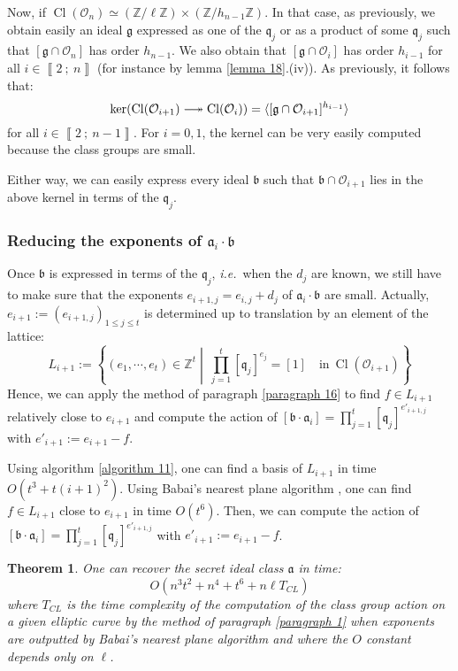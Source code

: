 \documentclass[a4paper,10pt]{report}
\theoremstyle{definition}
\theoremstyle{plain}
\newtheorem{theorem}[definition]{Theorem}
\theoremstyle{definition}
\newcommand{\ie}{\emph{i.e.}\ }
\newcommand{\Z}{\mathbb{Z}}
\newcommand{\mO}{\mathcal{O}}
\renewcommand{\i}[2]{\left\llbracket #1~;~#2\right\rrbracket}
\renewcommand{\(}{\left(}
\renewcommand{\)}{\right)}
\newcommand{\mf}[1]{\mathfrak{#1}}
\DeclareMathOperator{\Cl}{Cl}
\begin{document}
Now, if $\Cl(\mO_n)\simeq(\Z/\ell\Z)\times(\Z/h_{n-1}\Z)$.  In that case, as previously, we obtain easily an ideal $\mf{g}$ expressed as one of the $\mf{q}_j$ or as a product of some $\mf{q}_j$ such that $[\mf{g}\cap\mO_n]$ has order $h_{n-1}$. We also obtain that $[\mf{g}\cap\mO_i]$ has order $h_{i-1}$ for all $i\in\i{2}{n}$ (for instance by lemma \ref{lemma 18}.(iv)).  As previously, it follows that:
\[\ker(\Cl(\mO_{i+1})\relbar\joinrel\twoheadrightarrow\Cl(\mO_{i}))=\langle [\mf{g}\cap\mO_{i+1}]^{h_{i-1}}\rangle\]
for all $i\in\i{2}{n-1}$. For $i=0,1$, the kernel can be very easily computed because the class groups are small. 

Either way, we can easily express every ideal $\mf{b}$ such that $\mf{b}\cap\mO_{i+1}$ lies in the above kernel in terms of the $\mf{q}_j$.

\subsubsection{Reducing the exponents of $\mf{a}_i\cdot \mf{b}$}

Once $\mf{b}$ is expressed in terms of the $\mf{q}_j$, \ie when the $d_j$ are known, we still have to make sure that the exponents $e_{i+1,j}=e_{i,j}+d_j$ of $\mf{a}_i\cdot \mf{b}$ are small.  Actually, $e_{i+1}:=(e_{i+1,j})_{1\leq j\leq t}$ is determined up to translation by an element of the lattice:
\[L_{i+1}:=\left\{(e_1,\cdots,e_{t})\in\Z^{t} \middle| \  \prod_{j=1}^t[\mf{q}_j]^{e_j}=[1] \quad \mbox{in} \ \Cl(\mO_{i+1}) \right\}\]
Hence, we can apply the method of paragraph \ref{paragraph 16} to find $f\in L_{i+1}$ relatively close to $e_{i+1}$ and compute the action of $[\mf{b}\cdot\mf{a}_i]=\prod_{j=1}^t[\mf{q}_j]^{e'_{i+1,j}}$ with $e'_{i+1}:=e_{i+1}-f$.  

Using algorithm \ref{algorithm 11},  one can find a basis of $L_{i+1}$ in time $O(t^3+t(i+1)^2)$. Using Babai's nearest plane algorithm \cite{Babai}, one can find $f\in L_{i+1}$ close to $e_{i+1}$ in time $O(t^6)$. Then, we can compute the action of $[\mf{b}\cdot\mf{a}_i]=\prod_{j=1}^t[\mf{q}_j]^{e'_{i+1,j}}$ with $e'_{i+1}:=e_{i+1}-f$.  

\begin{theorem}
One can recover the secret ideal class $\mf{a}$ in time:
\[O\(n^3t^2+n^4+t^6+n\ell T_{CL}\)\]
where $T_{CL}$ is the time complexity of the computation of the class group action on a given elliptic curve by the method of paragraph \ref{paragraph 1} when exponents are outputted by Babai's nearest plane algorithm and where the $O$ constant depends only on $\ell$.
\end{theorem}
\end{document}
